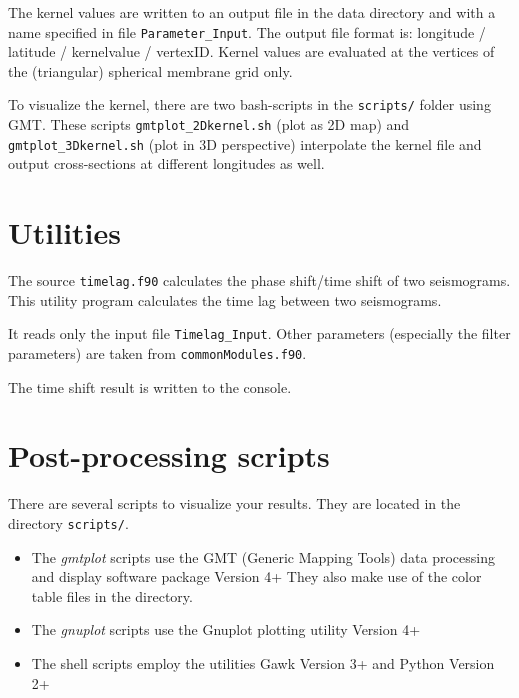 \documentclass[a4paper,
                          headsepline,
                          listof=totoc,
                          toc=listof,
                          headings=small]{scrreprt} %
\begin{document}
The kernel values are written to an output file in the data directory and with a name
specified in file \texttt{Parameter\_Input}. The output file format is: longitude / latitude / kernelvalue / vertexID.
Kernel values are evaluated at the vertices of the (triangular)
spherical membrane grid only.


To visualize the kernel, there are two bash-scripts in the \texttt{scripts/} folder
using GMT. These scripts \texttt{gmtplot\_2Dkernel.sh} (plot as 2D map) and
\texttt{gmtplot\_3Dkernel.sh} (plot in 3D perspective) interpolate the kernel file
and output cross-sections at different longitudes as well.




\appendix
\chapter{Utilities}

The source \texttt{timelag.f90} calculates the phase shift/time shift of two seismograms.
This utility program calculates the time lag between two seismograms.

It reads only the input file \texttt{Timelag\_Input}. Other parameters (especially
the filter parameters) are taken from \texttt{commonModules.f90}.

The time shift result is written to the console.


\chapter{Post-processing scripts}
There are several scripts to visualize your results. They are located in the
directory \texttt{scripts/}.


\begin{itemize}
  \item
The \textit{gmtplot} scripts use the GMT
(Generic Mapping Tools) data processing and display software package Version 4+
They also make use of the color table files in the directory.

  \item
The \textit{gnuplot} scripts use the Gnuplot plotting utility Version 4+

  \item
The shell scripts employ the utilities Gawk Version 3+ and Python Version 2+

\end{itemize}
\end{document}
